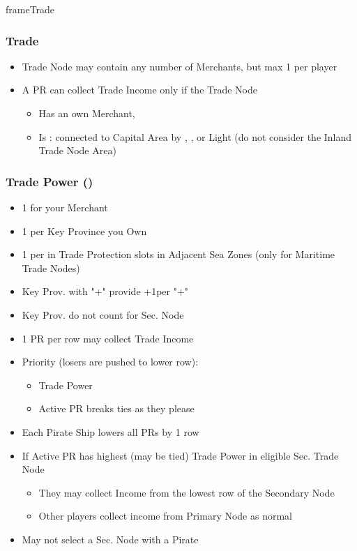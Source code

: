 \documentclass[10pt]{article}
\newlength{\fhTrade} \setlength\fhTrade{43.5\baselineskip}
\begin{document}
\begin{dynamiccontents*}{frameTrade}\begin{eubox}{\fhTrade}
	\subsubsection*{Trade }
	\begin{itemize}
		\item Trade Node may contain any number of Merchants, but max 1 per player
		\item A PR can collect Trade Income only if the Trade Node
		\begin{itemize}
			\item Has an own Merchant, 
			\item Is : connected to Capital Area by \towns, \vassals, \influence or Light \ships (do not consider the Inland Trade Node Area)
		\end{itemize}
	\end{itemize}

	\subsubsection*{Trade Power (\tradepower) }
	\begin{itemize}
		\item 1 \tradepower for your Merchant
		\item 1 \tradepower per Key Province you Own
		\item 1 \tradepower per \ship in Trade Protection slots in Adjacent Sea Zones (only for Maritime Trade Nodes)
		\item Key Prov. with "+" provide +1\tradepower per "+"
		\item Key Prov. do not count for Sec. Node
	\end{itemize}
	\begin{itemize}
		\item 1 PR per row may collect Trade Income
		\item Priority (losers are pushed to lower row):
		\begin{itemize}
			\item Trade Power
			\item Active PR breaks ties as they please
		\end{itemize}
		\item Each Pirate Ship lowers all PRs by 1 row
	\end{itemize}
	\begin{itemize}
		\item If Active PR has highest (may be tied) Trade Power in eligible Sec. Trade Node
		\begin{itemize}
			\item They may collect Income from the lowest row of the Secondary Node
			\item Other players collect income from Primary Node as normal
		\end{itemize}
		\item May not select a Sec. Node with a Pirate
	\end{itemize}
	{\botrules
}
\end{eubox}
\end{dynamiccontents*}
\end{document}
